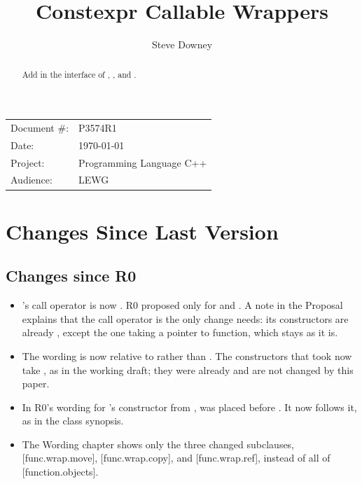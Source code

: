 \documentclass[a4paper,10pt,oneside,openany,final,article]{memoir}
\begin{document}
\title{Constexpr Callable Wrappers}
\author{%
  Steve Downey%
}
\date{}
\maketitle

\begin{flushright}
  \begin{tabular}{ll}
    Document \#: & P3574R1 \\
    Date: & \today \\
    Project: & Programming Language C++ \\
    Audience: & LEWG
  \end{tabular}
\end{flushright}

\begin{abstract}
Add  in the interface of , , and .
\end{abstract}

\tableofcontents*

\chapter*{Changes Since Last Version}

\section*{Changes since R0}

\begin{itemize}
\item {}'s call operator is now . R0 proposed  only for  and . A note in the Proposal explains that the call operator is the only change  needs: its constructors are already , except the one taking a pointer to function, which stays as it is.
\item The wording is now relative to \cite{N5054} rather than \cite{N4910}. The  constructors that took  now take , as in the working draft; they were already  and are not changed by this paper.
\item In R0's wording for 's constructor from ,  was placed before . It now follows it, as in the class synopsis.
\item The Wording chapter shows only the three changed subclauses, [func.wrap.move], [func.wrap.copy], and [func.wrap.ref], instead of all of [function.objects].
\end{itemize}
\end{document}

